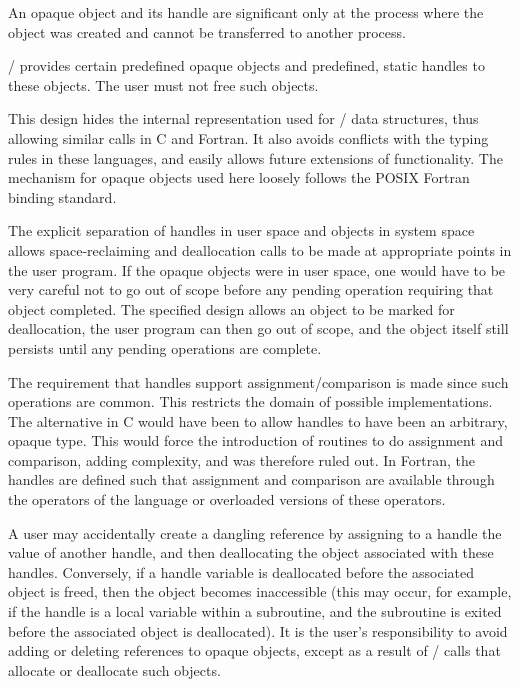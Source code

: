 An opaque object and its handle are significant only at the process
where the object was created and cannot be transferred to another
process.

\MPI/ provides certain predefined opaque objects and predefined,
static handles to these objects.
The user must not free such objects.

\begin{rationale}
This design
hides the internal representation used for \MPI/ data structures,
thus allowing similar calls in C and Fortran. It also avoids conflicts
with the typing rules
in these languages, and easily allows future extensions of
functionality.
The mechanism for opaque objects used here loosely follows the POSIX Fortran
binding standard.

The explicit separation of handles in user space and objects
in system space allows space-reclaiming and deallocation
calls to be made at appropriate points in the user program.  If the
opaque objects were in user space, one would have to be very careful not
to go out of scope before any pending operation requiring that object
completed.  The specified design allows an object to be marked for
deallocation, the user program can then go out of scope, and the object
itself still persists until any pending operations are complete.

The requirement that handles support
assignment/comparison is made since
such operations are common.
This restricts the domain of possible implementations.
The alternative in C would have been
to allow handles to have been an arbitrary, opaque type.  This would
force the introduction of routines to do assignment and comparison, adding
complexity, and was therefore ruled out.
In Fortran, the handles are defined such that assignment and comparison
are available through the operators of the language or overloaded
versions of these operators.
\end{rationale}

\begin{users}
A user may accidentally create a dangling reference by assigning to a
handle the value of another handle, and then deallocating the object
associated with these handles.  Conversely, if a handle variable is
deallocated before the associated object is freed, then the object
becomes inaccessible (this may occur, for example, if the handle is a
local variable within a subroutine, and the subroutine is exited
before the associated object is deallocated).  It is the user's
responsibility to avoid adding or deleting references to opaque
objects, except as a result of \MPI/ calls that allocate or deallocate
such objects.
\end{users}

